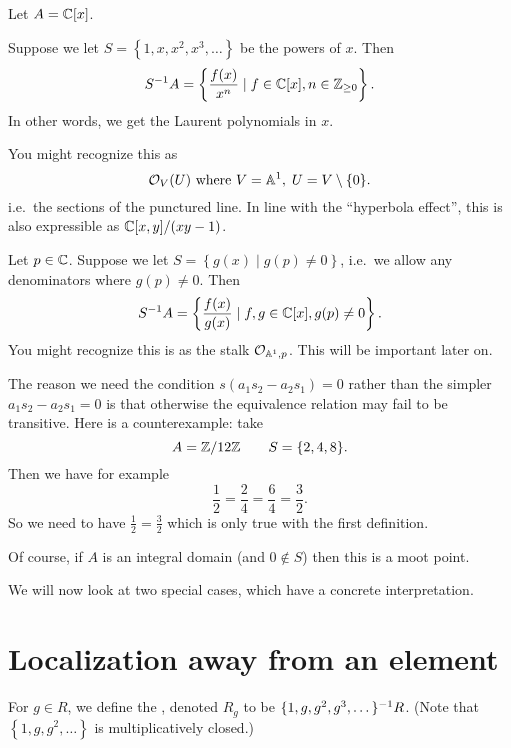 \begin{example}
	[Localizations of {$\CC[x]$}]
	Let $A = \mathbb C[x]$.
	\begin{enumerate}[(a)]
		\ii Suppose we let $S = \left\{ 1, x, x^2, x^3, \dots \right\}$
		be the powers of $x$.
		Then
		\[ S^{-1} A = \left\{ \frac{f(x)}{x^n}
			\mid f \in \mathbb C[x], n \in \mathbb Z_{\ge 0} \right\}.  \]
		In other words, we get the Laurent polynomials in $x$.

		You might recognize this as
		\[ \mathcal O_V(U) \text{ where } V = \mathbb A^1, \; U = V \setminus \{0\}. \]
		i.e.\ the sections of the punctured line.
		In line with the ``hyperbola effect'',
		this is also expressible as $\mathbb C[x,y] / (xy-1)$.

		\ii Let $p \in \mathbb C$.
		Suppose we let $S = \left\{ g(x) \mid g(p) \ne 0 \right\}$,
		i.e.\ we allow any denominators where $g(p) \ne 0$.
		Then
		\[ S^{-1} A = \left\{ \frac{f(x)}{g(x)}
			\mid f,g \in \mathbb C[x], g(p) \ne 0 \right\}.  \]
		You might recognize this is as the stalk $\mathcal O_{\mathbb A^1, p}$.
		This will be important later on.
	\end{enumerate}
\end{example}

\begin{remark}
	The reason we need the condition $s(a_1s_2 - a_2s_1) = 0$
	rather than the simpler $a_1s_2 - a_2s_1 = 0$ is that
	otherwise the equivalence relation may fail to be transitive.
	Here is a counterexample: take
	\[ A = \mathbb Z/12\mathbb Z \qquad S = \{ 2, 4, 8 \}. \]
	Then we have for example
	\[ \frac12 = \frac24 = \frac64 = \frac32. \]
	So we need to have $\frac12=\frac32$ which is only true
	with the first definition.

	Of course, if $A$ is an integral domain (and $0\notin S$)
	then this is a moot point.
\end{remark}


We will now look at two special cases,
which have a concrete interpretation.



\section{Localization away from an element}
\begin{definition}
	For $g \in R$, we define the ,
	denoted $R_g$ to be $\{1, g, g^2, g^3, \dots\}^{-1} R$.
	(Note that $\left\{ 1, g, g^2, \dots \right\}$ is multiplicatively closed.)
\end{definition}

